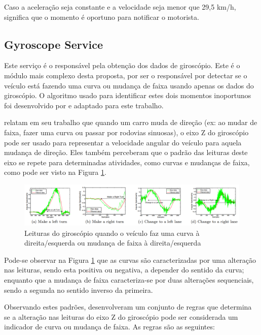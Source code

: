 Caso a aceleração seja constante e a velocidade seja menor que 29,5 km/h, significa que o momento é oportuno para notificar o motorista.

\subsection{Gyroscope Service}
\label{gyroscope-service}

Este serviço é o responsável pela obtenção dos dados de giroscópio. Este é o módulo mais complexo desta proposta, por ser o responsável por
detectar se o veículo está fazendo uma curva ou mudança de faixa usando apenas os dados do giroscópio. O algoritmo usado para identificar
estes dois momentos inoportunos foi desenvolvido por  e adaptado para este trabalho.

 relatam em seu trabalho que quando um carro muda de direção (ex: ao mudar de faixa, fazer uma curva ou passar
por rodovias sinuosas), o eixo Z do giroscópio pode ser usado para representar a velocidade angular do veículo para aquela mudança de direção.
Eles também perceberam que o padrão das leituras deste eixo se repete para determinadas atividades, como curvas e mudanças de faixa, como pode
ser visto na Figura \ref{leituras-giroscopio}.

\begin{figure}[h]
\centering
\includegraphics[width=1\textwidth]{images/leituras-giroscopio.png}
\caption{Leituras do giroscópio quando o veículo faz uma curva à direita/esquerda ou mudança de faixa à direita/esquerda \cite{chen2015invisible}}
\label{leituras-giroscopio}
\end{figure}

Pode-se observar na Figura \ref{leituras-giroscopio} que as curvas são caracterizadas por uma alteração nas leituras, sendo esta positiva ou negativa,
a depender do sentido da curva; enquanto que a mudança de faixa caracteriza-se por duas alterações sequenciais, sendo a segunda no sentido inverso
da primeira.

Observando estes padrões,  desenvolveram um conjunto de regras que determina se a alteração nas leituras do eixo Z do
giroscópio pode ser considerada um indicador de curva ou mudança de faixa. As regras são as seguintes:

